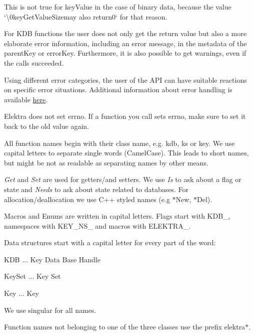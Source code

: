 This is not true for {\ttfamily key\+Value} in the case of binary data, because the value `\textquotesingle{}\textbackslash{}0key\+Get\+Value\+Size{\ttfamily may also return}0` for that reason.

For {\ttfamily K\+DB} functions the user does not only get the return value but also a more elaborate error information, including an error message, in the metadata of the {\ttfamily parent\+Key} or {\ttfamily error\+Key}. Furthermore, it is also possible to get warnings, even if the calls succeeded.

Using different error categories, the user of the A\+PI can have suitable reactions on specific error situations. Additional information about error handling is available \hyperlink{doc_dev_error-handling_md}{here}.

Elektra does not set {\ttfamily errno}. If a function you call sets {\ttfamily errno}, make sure to set it back to the old value again.

All function names begin with their class name, e.\+g. {\ttfamily kdb}, {\ttfamily ks} or {\ttfamily key}. We use capital letters to separate single words (Camel\+Case). This leads to short names, but might be not as readable as separating names by other means.

{\itshape Get} and {\itshape Set} are used for getters/and setters. We use {\itshape Is} to ask about a flag or state and {\itshape Needs} to ask about state related to databases. For allocation/deallocation we use C++ styled names (e.\+g {\ttfamily $\ast$\+New}, {\ttfamily $\ast$\+Del}).

Macros and Enums are written in capital letters. Flags start with {\ttfamily K\+D\+B\+\_\+}, namespaces with {\ttfamily K\+E\+Y\+\_\+\+N\+S\+\_\+} and macros with {\ttfamily E\+L\+E\+K\+T\+R\+A\+\_\+}.

Data structures start with a capital letter for every part of the word\+:


\begin{DoxyItemize}
\item {\ttfamily K\+DB} ... Key Data Base Handle
\item {\ttfamily Key\+Set} ... Key Set
\item {\ttfamily Key} ... Key
\end{DoxyItemize}

We use singular for all names.

Function names not belonging to one of the three classes use the prefix {\ttfamily elektra$\ast$}.

